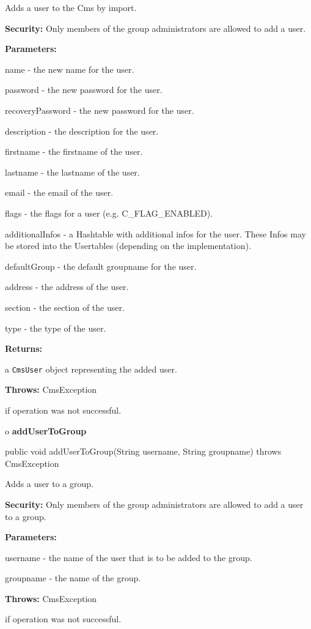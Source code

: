 \begin{description}
\htmlDD Adds a user to the Cms by import.

{\bf Security:} Only members of the group administrators are allowed to add a
user.

\begin{description}
\item {\bf Parameters:}

name - the new name for the user.

password - the new password for the user.

recoveryPassword - the new password for the user.

description - the description for the user.

firstname - the firstname of the user.

lastname - the lastname of the user.

email - the email of the user.

flags - the flags for a user (e.g. C\_FLAG\_ENABLED).

additionalInfos - a Hashtable with additional infos for the user. These Infos
may be stored into the Usertables (depending on the implementation).

defaultGroup - the default groupname for the user.

address - the address of the user.

section - the section of the user.

type - the type of the user.
\item {\bf Returns:}

a {\tt CmsUser} object representing the added user.
\item {\bf Throws:} CmsException

if operation was not successful.
\end{description}

\end{description}

o {\bf addUserToGroup}

\begin{PRE}
 public void addUserToGroup(String username,
                            String groupname) throws CmsException
\end{PRE}

\begin{description}
\htmlDD Adds a user to a group.

{\bf Security:} Only members of the group administrators are allowed to add a
user to a group.

\begin{description}
\item {\bf Parameters:}

username - the name of the user that is to be added to the group.

groupname - the name of the group.
\item {\bf Throws:} CmsException

if operation was not successful.
\end{description}

\end{description}

